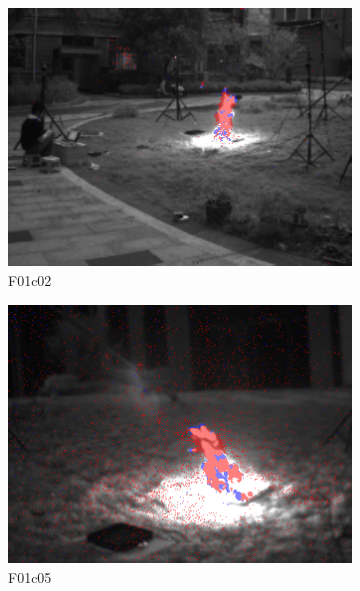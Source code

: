 \begin{figure}[ht]
    \centering
    \begin{subfigure}{0.32\textwidth}
        \centering
        \includegraphics[width=\textwidth]{figures/FlaDE_01.png}
        \caption{F01\textunderscore c02}
        \label{subfig:FlaDE_01}
    \end{subfigure}
    \hfill
    \begin{subfigure}{0.32\textwidth}
        \centering
        \includegraphics[width=\textwidth]{figures/FlaDE_02.png}
        \caption{F01\textunderscore c05}
        \label{subfig:FlaDE_02}
    \end{subfigure}
    \hfill
    \begin{subfigure}{0.32\textwidth}

\end{subfigure}
\end{figure}
